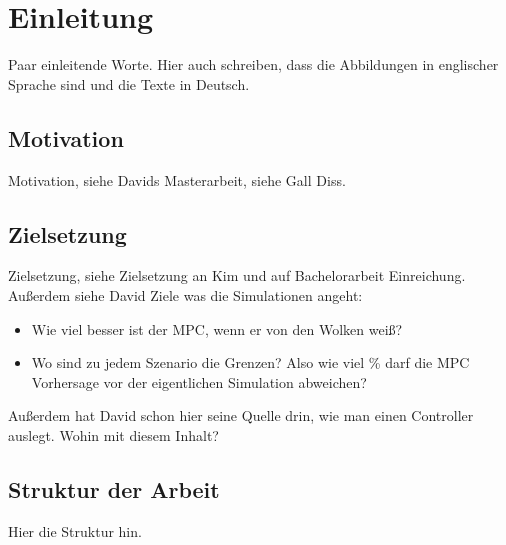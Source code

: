 \chapter{Einleitung} \label{ch_Einleitung}
Paar einleitende Worte.
Hier auch schreiben, dass die Abbildungen in englischer Sprache sind und die Texte in Deutsch.


\section{Motivation} \label{sec_Motivation}
Motivation, siehe Davids Masterarbeit, siehe Gall Diss.

\section{Zielsetzung} \label{sec_Zielsetzung}
Zielsetzung, siehe Zielsetzung an Kim und auf Bachelorarbeit Einreichung.
Außerdem siehe David Ziele was die Simulationen angeht:
\begin{itemize}
    \item Wie viel besser ist der MPC, wenn er von den Wolken weiß?
    \item Wo sind zu jedem Szenario die Grenzen? Also wie viel \% darf die MPC Vorhersage vor der eigentlichen Simulation abweichen?
\end{itemize}
Außerdem hat David schon hier seine Quelle drin, wie man einen Controller auslegt.
Wohin mit diesem Inhalt?

\section{Struktur der Arbeit} \label{sec_Struktur}
Hier die Struktur hin.

